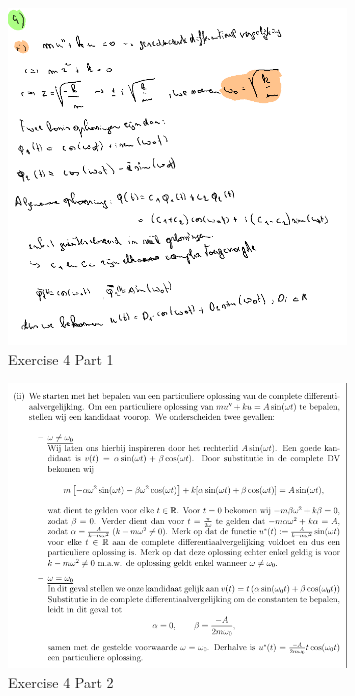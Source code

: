 \documentclass[a4paper]{report}
\begin{document}


\begin{figure}[H]
	\centering
	\includegraphics[width=0.8\textwidth]{assets/bord_8_ex_4_part_1.png}
	\caption{Exercise 4 Part 1}
	\label{fig:bord_8_ex_4_part_1}
\end{figure}

\begin{figure}[H]
	\centering
	\includegraphics[width=0.8\textwidth]{assets/bord_8_ex_4_part_2.png}
	\caption{Exercise 4 Part 2}
	\label{fig:bord_8_ex_4_part_2}
\end{figure}
\end{document}
